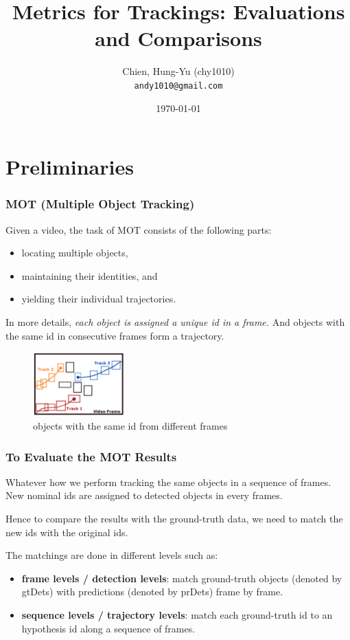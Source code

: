 \documentclass[slidetop, mathserif]{beamer}
\title[Metrics for Tracking]{Metrics for Trackings: Evaluations and Comparisons}
\author[chy1010]{Chien, Hung-Yu (chy1010) \\ {\tt andy1010@gmail.com}}
\date{\today}
\begin{document}
\frame{\titlepage}


\section{Preliminaries}

\begin{frame}
	\frametitle{MOT (Multiple Object Tracking)}
	
	Given a video, the task of MOT consists of the following parts:
	\begin{itemize}
		\item locating multiple objects,
		\item maintaining their identities, and
		\item yielding their individual trajectories.
	\end{itemize}
	
	In more details, \emph{each object is assigned a unique id in a frame.}
	And objects with the same id in consecutive frames form a trajectory.
	
	\begin{figure}
		\includegraphics[height=70pt]{pics/fig1.png}
		\caption{objects with the same id from different frames}
	\end{figure}
	
\end{frame}

\begin{frame}
	\frametitle{To Evaluate the MOT Results}
	
	Whatever how we perform tracking the same objects in a sequence of frames.
	New nominal ids are assigned to detected objects in every frames.
	
	Hence to compare the results with the ground-truth data, we need to match the new ids
	with the original ids.
	
	The matchings are done in different levels such as:
	\begin{itemize}
		\item {\bf frame levels / detection levels}:
		      match ground-truth objects (denoted by gtDets)
		      with predictions (denoted by prDets) frame by frame.
		\item {\bf sequence levels / trajectory levels}:
		      match each ground-truth id to an hypothesis id along a sequence of frames.
	\end{itemize}
	
\end{frame}
\end{document}
